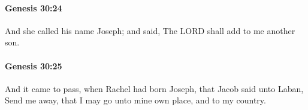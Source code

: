 		\paragraph{Genesis 30:24} %
			\label{GENESIS-30-24}

			And she called his name Joseph; and said, The LORD shall add to me another son.


		\paragraph{Genesis 30:25} %
			\label{GENESIS-30-25}

			And it came to pass, when Rachel had born Joseph, that Jacob said unto Laban, Send me away, that I may go unto mine own place, and to my country.


